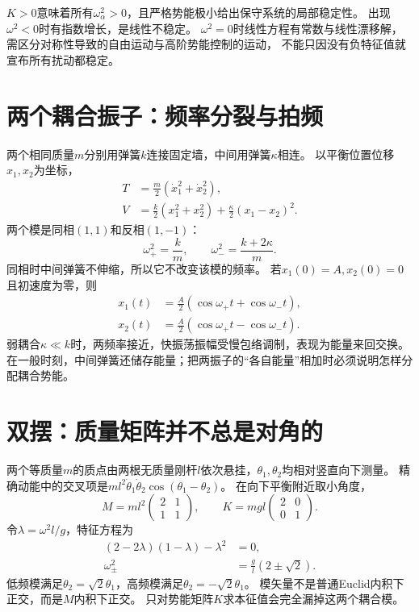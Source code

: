 $K > 0$意味着所有$\omega_\alpha^2 > 0$，且严格势能极小给出保守系统的局部稳定性。
出现$\omega^2 < 0$时有指数增长，是线性不稳定。
$\omega^2 = 0$时线性方程有常数与线性漂移解，需区分对称性导致的自由运动与高阶势能控制的运动，
不能只因没有负特征值就宣布所有扰动都稳定。

\section{两个耦合振子：频率分裂与拍频}
两个相同质量$m$分别用弹簧$k$连接固定墙，中间用弹簧$\kappa$相连。
以平衡位置位移$x_1,x_2$为坐标，
\begin{subequations}
 \begin{align}
  T &= \frac m2(\dot x_1^2 + \dot x_2^2),\\
  V &= \frac k2(x_1^2 + x_2^2) + \frac\kappa2(x_1 - x_2)^2.
 \end{align}
\end{subequations}
两个模是同相$(1,1)$和反相$(1,-1)$：
\begin{equation}
 \omega_+^2 = \frac km,\qquad \omega_-^2 = \frac{k + 2\kappa}{m}.
\end{equation}
同相时中间弹簧不伸缩，所以它不改变该模的频率。
若$x_1(0) = A,x_2(0) = 0$且初速度为零，则
\begin{align}
 x_1(t) &= \frac A2(\cos\omega_+t + \cos\omega_-t),\\
 x_2(t) &= \frac A2(\cos\omega_+t - \cos\omega_-t).
\end{align}
弱耦合$\kappa \ll k$时，两频率接近，快振荡振幅受慢包络调制，表现为能量来回交换。
在一般时刻，中间弹簧还储存能量；把两振子的“各自能量”相加时必须说明怎样分配耦合势能。

\section{双摆：质量矩阵并不总是对角的}
两个等质量$m$的质点由两根无质量刚杆$l$依次悬挂，$\theta_1,\theta_2$均相对竖直向下测量。
精确动能中的交叉项是$ml^2\dot\theta_1\dot\theta_2\cos(\theta_1 - \theta_2)$。
在向下平衡附近取小角度，
\begin{equation}
 M = ml^2\begin{pmatrix}2&1\\1&1\end{pmatrix},\qquad
 K = mgl\begin{pmatrix}2&0\\0&1\end{pmatrix}.
\end{equation}
令$\lambda = \omega^2l/g$，特征方程为
\begin{subequations}
 \begin{align}
  (2 - 2\lambda)(1 - \lambda) - \lambda^2 &= 0,\\
  \omega_{\pm}^2 &= \frac gl(2 \pm \sqrt2).
 \end{align}
\end{subequations}
低频模满足$\theta_2 = \sqrt2\theta_1$，高频模满足$\theta_2 = -\sqrt2\theta_1$。
模矢量不是普通Euclid内积下正交，而是$M$内积下正交。
只对势能矩阵$K$求本征值会完全漏掉这两个耦合模。

